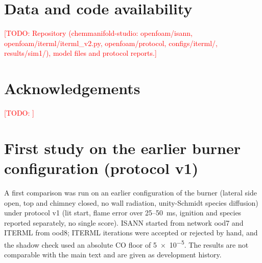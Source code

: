 \documentclass[preprint,review,12pt]{elsarticle}
\newcommand{\todo}[1]{\textcolor{red}{[TODO: #1]}}
\begin{document}
\section*{Data and code availability}
\todo{Repository (chemmanifold-studio: openfoam/isann, openfoam/iterml/iterml\_v2.py, openfoam/protocol,
configs/iterml/, results/sim1/), model files and protocol reports.}

\section*{Acknowledgements}
\todo{}

\appendix
\section{First study on the earlier burner configuration (protocol v1)}
\label{app:v1}
A first comparison was run on an earlier configuration of the burner (lateral side open, top and chimney
closed, no wall radiation, unity-Schmidt species diffusion) under protocol v1 (lit start, flame error over
25--50~ms, ignition and species reported separately, no single score). ISANN started from network ood7 and
ITERML from ood8; ITERML iterations were accepted or rejected by hand, and the shadow check used an absolute CO
floor of \num{5e-5}. The results are not comparable with the main text and are given as development history.

\begin{table}[h]
\centering
\caption{Protocol v1 on the earlier configuration, pure mode except ISANN run 1.}
\label{tab:v1}
\small
{}
\end{table}
\end{document}
